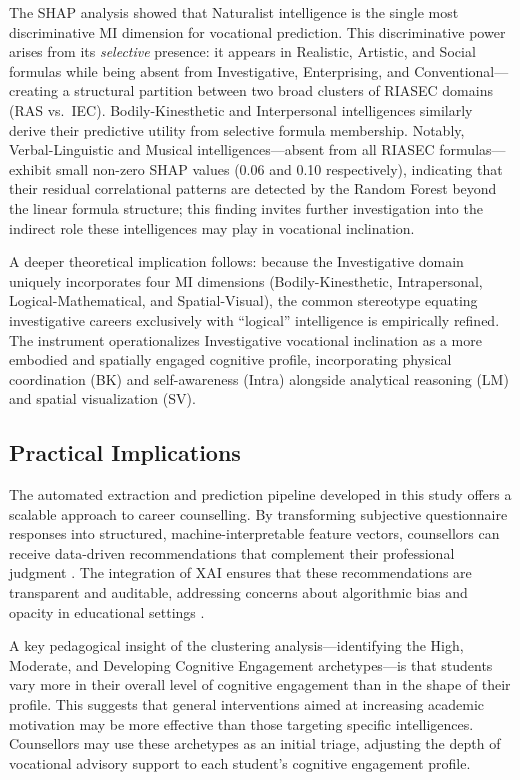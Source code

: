 \documentclass[12pt, a4paper]{article}
\begin{document}
The SHAP analysis showed that Naturalist intelligence is the single most discriminative MI dimension for vocational prediction. This discriminative power arises from its \textit{selective} presence: it appears in Realistic, Artistic, and Social formulas while being absent from Investigative, Enterprising, and Conventional---creating a structural partition between two broad clusters of RIASEC domains (RAS vs.\ IEC). Bodily-Kinesthetic and Interpersonal intelligences similarly derive their predictive utility from selective formula membership. Notably, Verbal-Linguistic and Musical intelligences---absent from all RIASEC formulas---exhibit small non-zero SHAP values (0.06 and 0.10 respectively), indicating that their residual correlational patterns are detected by the Random Forest beyond the linear formula structure; this finding invites further investigation into the indirect role these intelligences may play in vocational inclination.

A deeper theoretical implication follows: because the Investigative domain uniquely incorporates four MI dimensions (Bodily-Kinesthetic, Intrapersonal, Logical-Mathematical, and Spatial-Visual), the common stereotype equating investigative careers exclusively with ``logical'' intelligence is empirically refined. The instrument operationalizes Investigative vocational inclination as a more embodied and spatially engaged cognitive profile, incorporating physical coordination (BK) and self-awareness (Intra) alongside analytical reasoning (LM) and spatial visualization (SV).

\subsection{Practical Implications}

The automated extraction and prediction pipeline developed in this study offers a scalable approach to career counselling. By transforming subjective questionnaire responses into structured, machine-interpretable feature vectors, counsellors can receive data-driven recommendations that complement their professional judgment \cite{kamal2021smart}. The integration of XAI ensures that these recommendations are transparent and auditable, addressing concerns about algorithmic bias and opacity in educational settings \cite{zhang2022integrating, crompton2023artificial}.

A key pedagogical insight of the clustering analysis---identifying the High, Moderate, and Developing Cognitive Engagement archetypes---is that students vary more in their overall level of cognitive engagement than in the shape of their profile. This suggests that general interventions aimed at increasing academic motivation may be more effective than those targeting specific intelligences. Counsellors may use these archetypes as an initial triage, adjusting the depth of vocational advisory support to each student's cognitive engagement profile.
\end{document}
